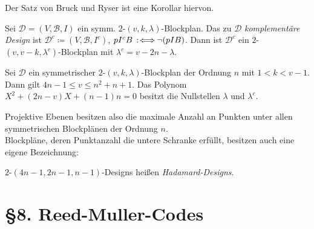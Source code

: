 \documentclass{cheat-sheet}
\newcommand{\F}{\mathbb{F}} %
\newcommand{\lin}{\text{lin}} %
\newcommand{\Design}{\mathcal{D}} %
\newcommand{\Blocks}{\mathcal{B}} %
\begin{document}
\begin{bem}
  Der Satz von Bruck und Ryser ist eine Korollar hiervon.
\end{bem}

\begin{bem}
  Sei $\Design = (V, \Blocks, I)$ ein symm. $2$-$(v, k, \lambda)$-Blockplan.
  Das zu $\Design$ \emph{komplementäre Design} ist $\Design^c \coloneqq (V, \Blocks, I^c)$, $p I^c B \!\!\enspace:\!\iff\!\! \neg (p I B)$.
  Dann ist $\Design^c$ ein $2$-$(v, v-k, \lambda^c)$-Blockplan mit $\lambda^c = v - 2n - \lambda$.
\end{bem}

\begin{satz}
  Sei $\Design$ ein symmetrischer $2$-$(v, k, \lambda)$-Blockplan der Ordnung $n$ mit $1 < k < v - 1$.
  Dann gilt \enspace
  $4n - 1 \leq v \leq n^2 + n + 1$.
  Das Polynom $X^2 + (2n - v) X + (n-1) n = 0$ besitzt die Nullstellen $\lambda$ und $\lambda^c$.
\end{satz}

\begin{bem}
  Projektive Ebenen besitzen also die maximale Anzahl an Punkten unter allen symmetrischen Blockplänen der Ordnung $n$. \\
  Blockpläne, deren Punktanzahl die untere Schranke erfüllt, besitzen auch eine eigene Bezeichnung:
\end{bem}

\begin{defn}
  $2$-$(4n{-}1, 2n{-}1, n{-}1)$-Designs heißen \emph{Hadamard-Designs}.
\end{defn}


\section{§8. Reed-Muller-Codes}


\end{document}
